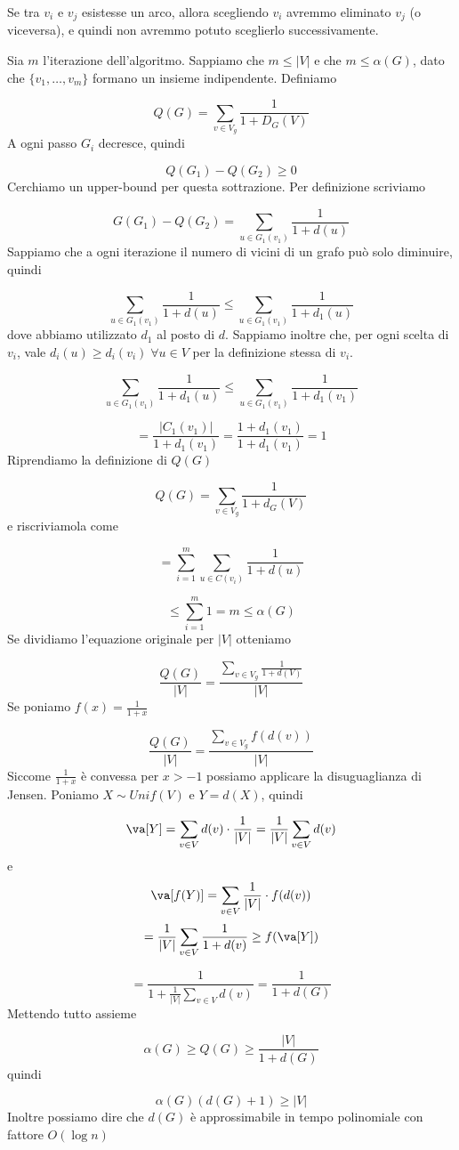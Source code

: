 \documentclass[12pt]{report}
\begin{document}
\begin{dimo}
\noindent 
Se tra $v_i$ e $v_j$ esistesse un arco, allora scegliendo $v_i$ avremmo eliminato $v_j$ (o viceversa), e quindi non avremmo potuto sceglierlo successivamente. 

Sia $m$ l'iterazione dell'algoritmo. Sappiamo che $m \leq |V|$ e che $m \leq \alpha(G)$, dato che $\{v_1,\dots,v_m\}$ formano un insieme indipendente. Definiamo 

$$Q(G) = \sum_{v \in V_g} \frac{1}{1 + D_G(V)}$$
A ogni passo $G_i$ decresce, quindi

$$Q(G_1) - Q(G_2) \geq 0$$
Cerchiamo un upper-bound per questa sottrazione.
Per definizione scriviamo

$$G(G_1) - Q(G_2) = \sum_{u \in G_1(v_1)} \frac{1}{1 + d(u)}$$
Sappiamo che a ogni iterazione il numero di vicini di un grafo può solo diminuire, quindi 

$$\sum_{u \in G_1(v_1)} \frac{1}{1 + d(u)} \leq \sum_{u \in G_1(v_1)} \frac{1}{1 + d_1(u)}$$
dove abbiamo utilizzato $d_1$ al posto di $d$. Sappiamo inoltre che, per ogni scelta di $v_i$, vale $d_i(u) \geq d_i(v_i) \; \forall u \in V $ per la definizione stessa di $v_i$. 

$$\sum_{u \in G_1(v_1)} \frac{1}{1 + d_1(u)} \leq \sum_{u \in G_1(v_1)} \frac{1}{1 + d_1(v_1)}  $$

$$= \frac{|C_1(v_1)|}{1 + d_1(v_1)} = \frac{1 + d_1(v_1)}{1 + d_1(v_1)}  = 1$$
Riprendiamo la definizione di $Q(G)$

$$Q(G) = \sum_{v \in V_g} \frac{1}{1 + d_G(V)}$$
e riscriviamola come

$$= \sum_{i = 1}^m \sum_{u \in C(v_i)} \frac{1}{1 + d(u)}$$

$$\leq \sum_{i = 1}^m 1 = m \leq \alpha(G)$$
Se dividiamo l'equazione originale per $|V|$ otteniamo

$$\frac{Q(G)}{|V|} = \frac{\sum_{v \in V_g} \frac{1}{1 + d(V)}}{|V|}$$
Se poniamo $f(x) = \frac{1}{1+x}$

$$\frac{Q(G)}{|V|} = \frac{\sum_{v \in V_g} f(d(v))}{|V|}$$
Siccome $\frac{1}{1+x}$ è convessa per $x > -1$ possiamo applicare la disuguaglianza di Jensen. Poniamo $X \sim Unif(V)$ e $Y = d(X)$, quindi

$$\va[Y] = \sum_{v \in V} d(v) \cdot \frac{1}{|V|} = \frac{1}{|V|} \sum_{v \in V} d(v)$$
e
$$\va[f(Y)] = \sum_{v \in V} \frac{1}{|V|} \cdot f(d(v))$$
$$= \frac{1}{|V|} \sum_{v \in V} \frac{1}{1 + d(v)} \geq f(\va[Y])$$

$$= \frac{1}{1 + \frac{1}{|V|} \sum_{v \in V} d(v)} = \frac{1}{1 + d(G)}$$
Mettendo tutto assieme

$$\alpha(G) \geq Q(G) \geq \frac{|V|}{1 + d(G)}$$
quindi

$$\alpha(G) (d(G) + 1) \geq |V|$$
Inoltre possiamo dire che $d(G)$ è approssimabile in tempo polinomiale con fattore $O(\log{n})$
\end{dimo}
\end{document}
